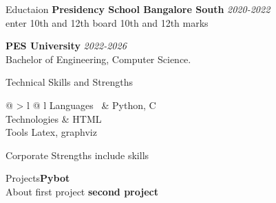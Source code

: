 \documentclass{resume}
\begin{document}
\begin{rSection}{Eductaion}
{\bf Presidency School Bangalore South} \hfill {\em 2020-2022}
\\ enter 10th and 12th board  \hfill {10th and 12th marks}

{\bf PES University} \hfill {\em 2022-2026}
\\ Bachelor of Engineering, Computer Science. 
\end{rSection}

\begin{rSection}{Technical Skills and Strengths}
\begin{tabular}{@{} > {\bfseries}l @{\hspace{6ex}} l }
Languages \ & Python, C \\
Technologies & HTML \\
Tools Latex, graphviz \\
\end{tabular}
\end{rSection}

\begin{rSection}{Corporate Strengths}
include skills
\end{rSection}

\begin{rSection}{Projects}{\bf Pybot}
\\About first project {\bf second project}
\end{rSection}
\end{document}
